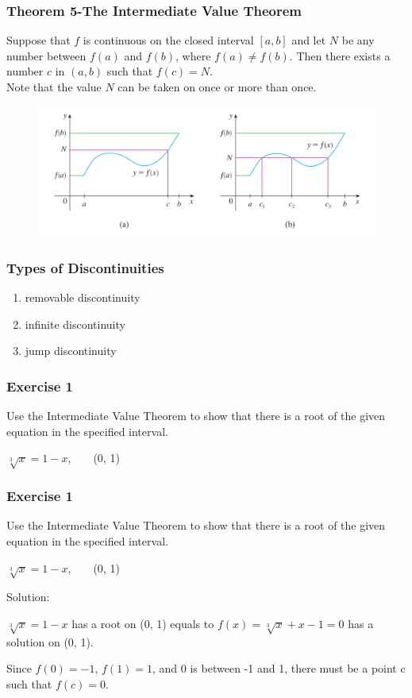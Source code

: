 \documentclass{beamer}
\begin{document}
	\begin{frame}
		\frametitle{Theorem 5-The Intermediate Value Theorem}
		Suppose that \alert{$f$ is continuous on the closed interval $[a,b]$} and let $N$ be any number between $f(a)$ and $f(b)$, where $f(a) \neq f(b)$. Then there exists a number $c$ in $(a,b)$ such that $f(c) = N$.\\
		Note that the value $N$ can be taken on once or more than once.
		\begin{figure}
			\includegraphics[width=0.9\linewidth]{in.png}
		\end{figure}
	\end{frame}
	\begin{frame}
		\frametitle{Types of Discontinuities}
		\begin{enumerate}
			\item removable discontinuity
			\item infinite discontinuity
			\item jump discontinuity
		\end{enumerate}
	\end{frame}
	\begin{frame}
		\frametitle{Exercise 1}
		Use the Intermediate Value Theorem to show that there is a root of the given equation in the specified interval.
		\begin{center}
			$\sqrt[3]{x} = 1 - x$,\ \ \ \ (0, 1)
		\end{center}
	\end{frame}
	
	\begin{frame}
		\frametitle{Exercise 1}
		Use the Intermediate Value Theorem to show that there is a root of the given equation in the specified interval.
		\begin{center}
			$\sqrt[3]{x} = 1 - x$,\ \ \ \ (0, 1)
		\end{center}
		Solution:
		
		$\sqrt[3]{x} = 1 - x$ has a root on (0, 1) equals to $f(x) = \sqrt[3]{x} + x -1 = 0$ has a solution on (0, 1).
		
		Since $f(0) = -1$, $f(1) = 1$, and 0 is between -1 and 1, there must be a point c such that $f(c) = 0$.
	\end{frame}
\end{document}
